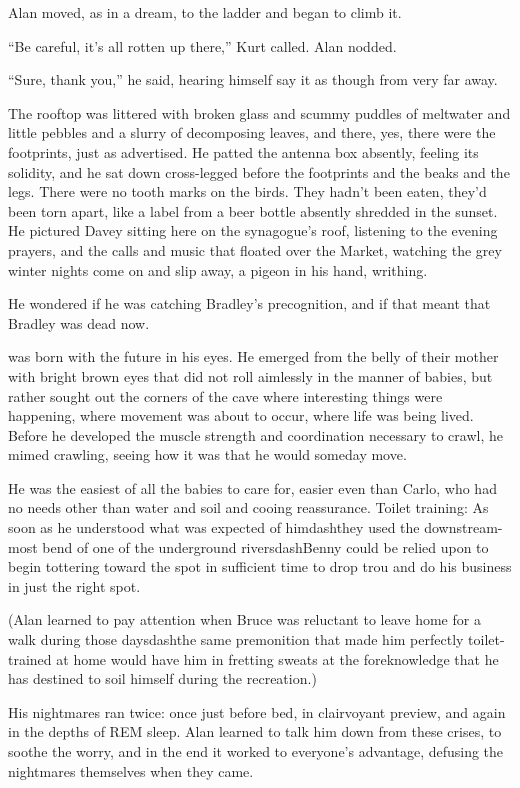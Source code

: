 Alan moved, as in a dream, to the ladder and began to climb it.

``Be careful, it's all rotten up there,'' Kurt called.  Alan nodded.

``Sure, thank you,'' he said, hearing himself say it as though from
very far away.

The rooftop was littered with broken glass and scummy puddles of
meltwater and little pebbles and a slurry of decomposing leaves, and
there, yes, there were the footprints, just as advertised.  He patted
the antenna box absently, feeling its solidity, and he sat down
cross-legged before the footprints and the beaks and the legs.  There
were no tooth marks on the birds.  They hadn't been eaten, they'd been
torn apart, like a label from a beer bottle absently shredded in the
sunset.  He pictured Davey sitting here on the synagogue's roof,
listening to the evening prayers, and the calls and music that floated
over the Market, watching the grey winter nights come on and slip
away, a pigeon in his hand, writhing.

He wondered if he was catching Bradley's precognition, and if that
meant that Bradley was dead now.

 was born with the future in his eyes.  He emerged from the
belly of their mother with bright brown eyes that did not roll
aimlessly in the manner of babies, but rather sought out the corners
of the cave where interesting things were happening, where movement
was about to occur, where life was being lived.  Before he developed
the muscle strength and coordination necessary to crawl, he mimed
crawling, seeing how it was that he would someday move.

He was the easiest of all the babies to care for, easier even than
Carlo, who had no needs other than water and soil and cooing
reassurance.  Toilet training:  As soon as he understood what was
expected of himdash{}they used the downstream-most bend of one of the
underground riversdash{}Benny could be relied upon to begin tottering
toward the spot in sufficient time to drop trou and do his business in
just the right spot.

(Alan learned to pay attention when Bruce was reluctant to leave home
for a walk during those daysdash{}the same premonition that made him
perfectly toilet-trained at home would have him in fretting sweats at
the foreknowledge that he has destined to soil himself during the
recreation.)

His nightmares ran twice:  once just before bed, in clairvoyant
preview, and again in the depths of REM sleep.  Alan learned to talk
him down from these crises, to soothe the worry, and in the end it
worked to everyone's advantage, defusing the nightmares themselves
when they came.

